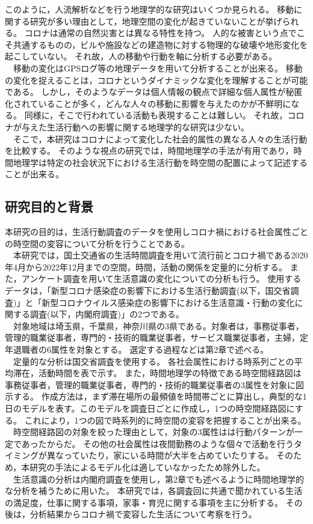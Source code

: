 \documentclass[paper={210mm,297mm},line_length=35zw,number_of_lines=31,head_space=30mm,gutter=40mm,baselineskip=2.0zw,headfoot_verticalposition=1.5zw]{jlreq}
\begin{document}
このように，人流解析などを行う地理学的な研究はいくつか見られる。
移動に関する研究が多い理由として，地理空間の変化が起きていないことが挙げられる。
コロナは通常の自然災害とは異なる特性を持つ。
人的な被害という点でこそ共通するものの，ビルや施設などの建造物に対する物理的な破壊や地形変化を起こしていない。
それ故，人の移動や行動を軸に分析する必要がある。\\
　移動の変化はGPSログ等の地理データを用いて分析することが出来る。
移動の変化を捉えることは，コロナというダイナミックな変化を理解することが可能である。
しかし，そのようなデータは個人情報の観点で詳細な個人属性が秘匿化されていることが多く，どんな人々の移動に影響を与えたのかが不鮮明になる。
同様に，そこで行われている活動も表現することは難しい。
それ故，コロナが与えた生活行動への影響に関する地理学的な研究は少ない。\\
　そこで，本研究はコロナによって変化した社会的属性の異なる人々の生活行動を比較する。
そのような視点の研究では，時間地理学の手法が有用であり，時間地理学は特定の社会状況下における生活行動を時空間の配置によって記述することが出来る。\\

\subsection{研究目的と背景}

本研究の目的は，生活行動調査のデータを使用しコロナ禍における社会属性ごとの時空間の変容について分析を行うことである。\\
　本研究では，国土交通省の生活時間調査を用いて流行前とコロナ禍である2020年4月から2022年12月までの空間，時間，活動の関係を定量的に分析する。
また，アンケート調査を用いて生活意識の変化についての分析も行う。
使用するデータは，「新型コロナ感染症の影響下における生活行動調査(以下，国交省調査)」と「新型コロナウイルス感染症の影響下における生活意識・行動の変化に関する調査(以下，内閣府調査)」の2つである。\\
　対象地域は埼玉県，千葉県，神奈川県の3県である。対象者は，事務従事者，管理的職業従事者，専門的・技術的職業従事者，サービス職業従事者，主婦，定年退職者の6属性を対象とする。
選定する過程などは第2章で述べる。\\
　定量的な分析は国交省調査を使用する。
各社会属性における時系列ごとの平均滞在，活動時間を表で示す。
また，時間地理学の特徴である時空間経路図は事務従事者，管理的職業従事者，専門的・技術的職業従事者の3属性を対象に図示する。
作成方法は，まず滞在場所の最頻値を時間帯ごとに算出し，典型的な1日のモデルを表す。このモデルを調査日ごとに作成し，1つの時空間経路図にする。
これにより，1つの図で時系列的に時空間の変容を把握することが出来る。\\
　時空間経路図の対象を絞った理由として，対象の3属性はは行動パターンが一定であったからだ。
その他の社会属性は夜間勤務のような個々で活動を行うタイミングが異なっていたり，家にいる時間が大半を占めていたりする。
そのため，本研究の手法によるモデル化は適していなかったため除外した。\\
　生活意識の分析は内閣府調査を使用し，第2章でも述べるように時間地理学的な分析を補うために用いた。
本研究では，各調査回に共通で聞かれている生活の満足度，仕事に関する事項，家事・育児に関する事項を主に分析する。
その後は，分析結果からコロナ禍で変容した生活について考察を行う。\\
\end{document}
